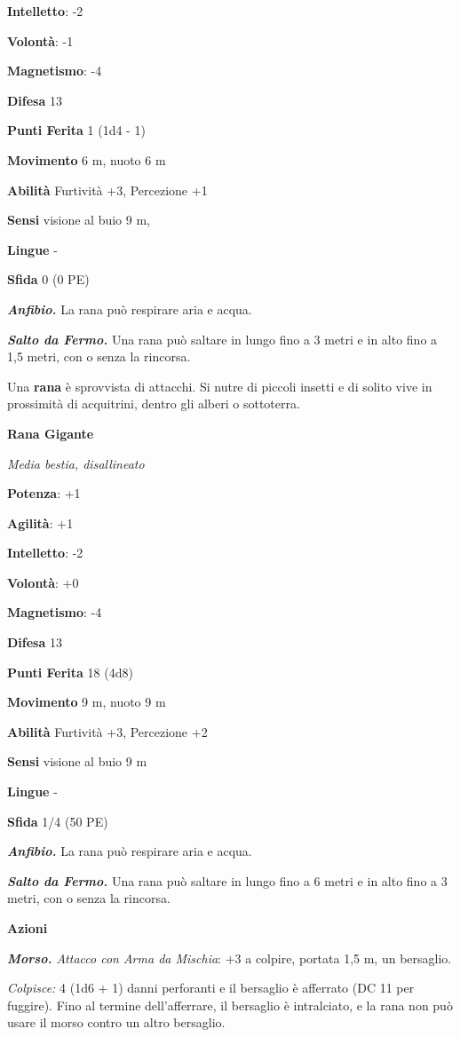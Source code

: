 \begin{multicols}{2}
\textbf{Intelletto}: -2

\textbf{Volontà}: -1

\textbf{Magnetismo}: -4

\textbf{Difesa} 13

\textbf{Punti Ferita} 1 (1d4 - 1)

\textbf{Movimento} 6 m, nuoto 6 m

\textbf{Abilità} Furtività +3, Percezione +1

\textbf{Sensi} visione al buio 9 m, 

\textbf{Lingue} -

\textbf{Sfida} 0 (0 PE)

\emph{\textbf{Anfibio.}} La rana può respirare aria e acqua.

\emph{\textbf{Salto da Fermo.}} Una rana può saltare in lungo fino a 3
metri e in alto fino a 1,5 metri, con o senza la rincorsa.

Una \textbf{rana} è sprovvista di attacchi. Si nutre di piccoli insetti
e di solito vive in prossimità di acquitrini, dentro gli alberi o
sottoterra.

\textbf{Rana Gigante}

\emph{Media bestia, disallineato}

\textbf{Potenza}: +1

\textbf{Agilità}: +1

\textbf{Intelletto}: -2

\textbf{Volontà}: +0

\textbf{Magnetismo}: -4

\textbf{Difesa} 13

\textbf{Punti Ferita} 18 (4d8)

\textbf{Movimento} 9 m, nuoto 9 m

\textbf{Abilità} Furtività +3, Percezione +2

\textbf{Sensi} visione al buio 9 m

\textbf{Lingue} -

\textbf{Sfida} 1/4 (50 PE)

\emph{\textbf{Anfibio.}} La rana può respirare aria e acqua.

\emph{\textbf{Salto da Fermo.}} Una rana può saltare in lungo fino a 6
metri e in alto fino a 3 metri, con o senza la rincorsa.

\textbf{Azioni}

\emph{\textbf{Morso.} Attacco con Arma da Mischia}: +3 a colpire,
portata 1,5 m, un bersaglio.

\emph{Colpisce:} 4 (1d6 + 1) danni perforanti e il bersaglio è afferrato
(DC 11 per fuggire). Fino al termine dell'afferrare, il bersaglio è
intralciato, e la rana non può usare il morso contro un altro bersaglio.


\end{multicols}
